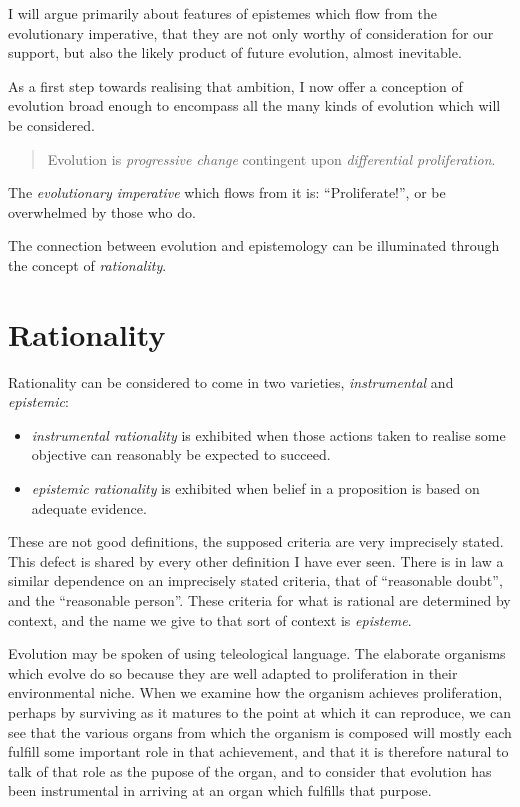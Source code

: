 I will argue primarily about features of epistemes which flow from the evolutionary imperative, that they are not only worthy of consideration for our support, but also the likely product of future evolution, almost inevitable.

As a first step towards realising that ambition, I now offer a conception of evolution broad enough to encompass all the many kinds of evolution which will be considered.


\begin{quote}
Evolution is \emph{progressive change} contingent upon \emph{differential proliferation}.
\end{quote}

The \emph{evolutionary imperative} which flows from it is: ``Proliferate!'', or be overwhelmed by those who do.

The connection between evolution and epistemology can be illuminated through the concept of \emph{rationality}.

\section{Rationality}

Rationality can be considered to come in two varieties, \emph{instrumental} and  \emph{epistemic}:

\begin{itemize}
\item[]\emph{instrumental rationality} is exhibited when those actions taken to realise some objective can reasonably be expected to succeed.
\item[]\emph{epistemic rationality} is exhibited when belief in a proposition is based on adequate evidence.
\end{itemize}

These are not good definitions, the supposed criteria are very imprecisely stated.
This defect is shared by every other definition I have ever seen.
There is in law a similar dependence on an imprecisely stated criteria, that of ``reasonable doubt'', and the ``reasonable person''.
These criteria for what is rational are determined by context, and the name we give to that sort of context is \emph{episteme}.

Evolution may be spoken of using teleological language.
The elaborate organisms which evolve do so because they are well adapted to proliferation in their environmental niche.
When we examine how the organism achieves proliferation, perhaps by surviving as it matures to the point at which it can reproduce, we can see that the various organs from which the organism is composed will mostly each fulfill some important role in that achievement, and that it is therefore natural to talk of that role as the pupose of the organ, and to consider that evolution has been instrumental in arriving at an organ which fulfills that purpose.

